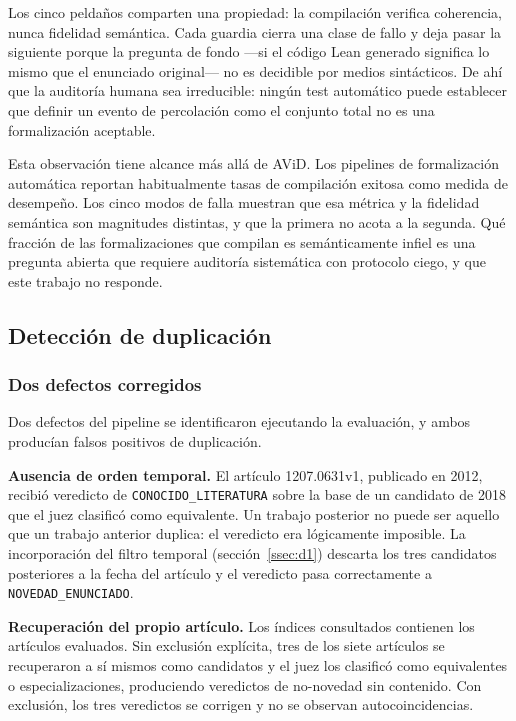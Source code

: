 \documentclass[12pt,a4paper]{article}
\theoremstyle{remark}
\begin{document}
Los cinco peldaños comparten una propiedad: la compilación verifica coherencia, nunca fidelidad semántica. Cada guardia cierra una clase de fallo y deja pasar la siguiente porque la pregunta de fondo —si el código Lean generado significa lo mismo que el enunciado original— no es decidible por medios sintácticos. De ahí que la auditoría humana sea irreducible: ningún test automático puede establecer que definir un evento de percolación como el conjunto total no es una formalización aceptable.

Esta observación tiene alcance más allá de AViD. Los pipelines de formalización automática reportan habitualmente tasas de compilación exitosa como medida de desempeño. Los cinco modos de falla muestran que esa métrica y la fidelidad semántica son magnitudes distintas, y que la primera no acota a la segunda. Qué fracción de las formalizaciones que compilan es semánticamente infiel es una pregunta abierta que requiere auditoría sistemática con protocolo ciego, y que este trabajo no responde.

\subsection{Detección de duplicación}

\subsubsection{Dos defectos corregidos}

Dos defectos del pipeline se identificaron ejecutando la evaluación, y ambos producían falsos positivos de duplicación.

\textbf{Ausencia de orden temporal.} El artículo 1207.0631v1, publicado en 2012, recibió veredicto de \texttt{CONOCIDO\_LITERATURA} sobre la base de un candidato de 2018 que el juez clasificó como equivalente. Un trabajo posterior no puede ser aquello que un trabajo anterior duplica: el veredicto era lógicamente imposible. La incorporación del filtro temporal (sección~\ref{ssec:d1}) descarta los tres candidatos posteriores a la fecha del artículo y el veredicto pasa correctamente a \texttt{NOVEDAD\_ENUNCIADO}.

\textbf{Recuperación del propio artículo.} Los índices consultados contienen los artículos evaluados. Sin exclusión explícita, tres de los siete artículos se recuperaron a sí mismos como candidatos y el juez los clasificó como equivalentes o especializaciones, produciendo veredictos de no-novedad sin contenido. Con exclusión, los tres veredictos se corrigen y no se observan autocoincidencias.
\end{document}
